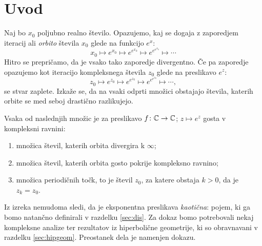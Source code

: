 \section{Uvod} \label{sec:intro}

Naj bo \(x_0\) poljubno realno število. Opazujemo, kaj se dogaja z zaporedjem iteracij ali \emph{orbito} števila \(x_0\) glede na funkcijo \(e^{x}\):
\[x_0 \mapsto e^{x_0} \mapsto e^{e^{x_0}} \mapsto e^{e^{e^{x_0}}} \mapsto \cdots\]
Hitro se prepričamo, da je vsako tako zaporedje divergentno. Če pa zaporedje opazujemo kot iteracijo kompleksnega števila \(z_0\) glede na preslikavo \(e^z\):
\[z_0 \mapsto e^{z_0} \mapsto e^{e^{z_0}} \mapsto e^{e^{e^{z_0}}} \mapsto \cdots,\]
se stvar zaplete. Izkaže se, da na vsaki odprti množici obstajajo števila, katerih orbite se med seboj drastično razlikujejo.

\begin{izrek} \label{thm:orbits}
    Vsaka od naslednjih množic je za preslikavo \(f \colon \mathbb C \to \mathbb C\); \(z \mapsto e^{z}\) gosta v kompleksni ravnini:
    \begin{enumerate}
        \item množica števil, katerih orbita divergira k \(\infty\);
        \item množica števil, katerih orbita gosto pokrije kompleksno ravnino;
        \item množica periodičnih točk, to je števil \(z_0\), za katere obstaja
            \(k > 0\), da je \(z_k = z_0\).
    \end{enumerate}
\end{izrek}

\noindent Iz izreka nemudoma sledi, da je eksponentna preslikava \emph{kaotična}: pojem, ki ga bomo natančno definirali v razdelku \ref{sec:dis}. Za dokaz bomo potrebovali nekaj kompleksne analize ter rezultatov iz hiperbolične geometrije, ki so obravnavani v razdelku \ref{sec:hipgeom}. Preostanek dela je namenjen dokazu.
